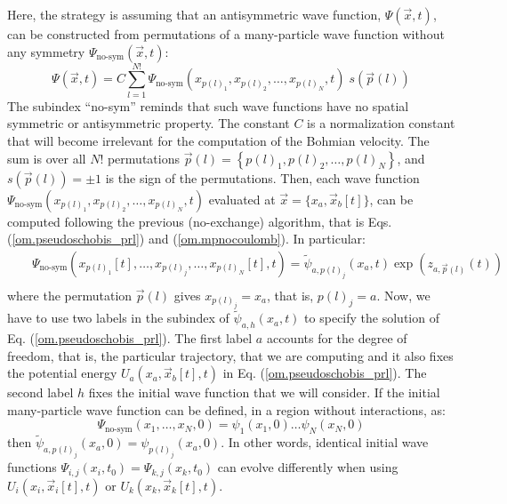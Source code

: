 \documentclass[nofootinbib, secnumarabic, amsmath, nobibnotes,11pt,aps,pra, floatfix]{revtex4-1}
\newcommand{\eref}[1]{Eq. (\ref{#1})}
\begin{document}
Here, the strategy is assuming that an antisymmetric wave function,
$\Psi (\vec x,t)$, can be constructed from permutations of a
many-particle wave function without any symmetry $\Psi_\textrm{no-sym}(\vec
x,t)$:
\begin{equation}
\label{om.prl_sumexbis}
\Psi(\vec{x},{t}) = C \sum\limits_{l = 1}^{N!} \Psi_\textrm{no-sym}(x_{p(l)_1},x_{p(l)_2}, \ldots ,x_{p(l)_N},t) \; s\left( \vec{p}(l) \right)
\end{equation}
The subindex ``no-sym'' reminds that such wave functions have no
spatial symmetric or antisymmetric property. The constant $C$ is a
normalization constant that will become irrelevant for the
computation of the Bohmian velocity. The sum is over all $N!$
permutations $\vec{p}(l) = \left\{
p{{(l)}_{1}},p{{(l)}_{2}},\ldots,p{{(l)}_{N}} \right\}$, and
$s\left( \vec{p}(l) \right) = \pm 1$ is the sign of the
permutations. Then, each wave function
$\Psi_\textrm{no-sym}(x_{p(l)_1},x_{p(l)_2}, \ldots , x_{p(l)_N},t)$
evaluated at $\vec x = \{x_a,\vec x_b[t]\}$, can be computed
following the previous (no-exchange) algorithm, that is  Eqs.
(\ref{om.pseudoschobis_prl}) and (\ref{om.mpnocoulomb}). In
particular:
\begin{eqnarray}
\label{om.prl_def}
&&\Psi_\textrm{no-sym}(x_{p(l)_1}[t],\ldots , x_{p(l)_j},\ldots ,
x_{p(l)_N}[t],t) = \tilde{\psi}_{a,{p}(l)_j}(x_a,t) \exp { (z_{a,\vec{p}(l)}(t)) }\nonumber\\
\end{eqnarray}
where the permutation $\vec p(l)$ gives $x_{p(l)_j} = x_a$, that is, ${p(l)_j} = a$. Now, we have to use two labels in the subindex of $\tilde{\psi}_{a,h}(x_a,t)$ to specify the solution of \eref{om.pseudoschobis_prl}. The first label $a$ accounts for the degree of freedom, that is, the particular trajectory, that we are computing and it also fixes the potential energy $U_{a}(x_{a},\vec x_{b}[t],t)$ in \eref{om.pseudoschobis_prl}. The second label $h$ fixes the initial wave function that we will consider. If the initial many-particle wave function can be defined, in a region without interactions, as:
\begin{equation}
\label{om.prl_defini}
\Psi_\textrm{no-sym}(x_{1}, \ldots ,x_{N},0) = \psi_1(x_1,0) \ldots\psi_N(x_N,0)
\end{equation}
then $\tilde{\psi}_{a,{p}(l)_j}(x_a,0) = \psi_{p(l)_j}(x_a,0)$. In other words, identical initial wave functions $\Psi_{i,j}(x_{i},t_{0}) = \Psi_{k,j}(x_{k},t_{0})$ can evolve differently when using $U_{i}(x_{i},\vec{x}_{i}[t],t)$ or $U_{k}(x_{k},\vec{x}_{k}[t],t)$.
\end{document}
